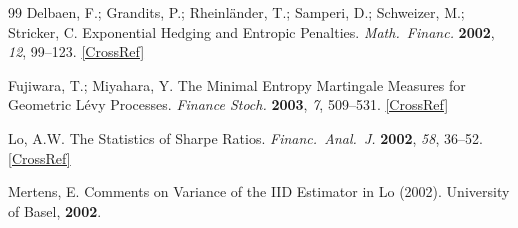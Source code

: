 \documentclass[11pt]{article}
\theoremstyle{definition}
\theoremstyle{remark}
\begin{document}
\begin{thebibliography}{99}
Delbaen, F.; Grandits, P.; Rheinl\"ander, T.; Samperi, D.;
Schweizer, M.; Stricker, C. Exponential Hedging and Entropic
Penalties. \emph{Math.\ Financ.} \textbf{2002}, \emph{12},
99--123.
\href{https://doi.org/10.1111/1467-9965.02001}{[CrossRef]}

Fujiwara, T.; Miyahara, Y. The Minimal Entropy Martingale Measures
for Geometric L\'evy Processes. \emph{Finance Stoch.} \textbf{2003},
\emph{7}, 509--531.
\href{https://doi.org/10.1007/s007800200099}{[CrossRef]}

Lo, A.W. The Statistics of Sharpe Ratios. \emph{Financ.\ Anal.\ J.}
\textbf{2002}, \emph{58}, 36--52.
\href{https://doi.org/10.2469/faj.v58.n4.2453}{[CrossRef]}

Mertens, E. Comments on Variance of the IID Estimator in Lo (2002).
University of Basel, \textbf{2002}.

\end{thebibliography}
\end{document}
